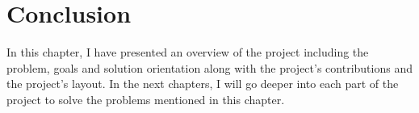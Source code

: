 \documentclass[../main.tex]{subfiles}
\begin{document}
\section{Conclusion}
In this chapter, I have presented an overview of the project including the problem, goals and solution orientation along with the project's contributions and the project's layout.
In the next chapters, I will go deeper into each part of the project to solve the problems mentioned in this chapter.
\end{document}
